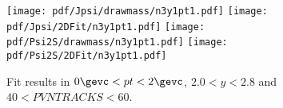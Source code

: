 \begin{figure}[H]
\begin{center}
\texttt{[image: pdf/Jpsi/drawmass/n3y1pt1.pdf]}
\texttt{[image: pdf/Jpsi/2DFit/n3y1pt1.pdf]}
\vspace*{-0.5cm}
\texttt{[image: pdf/Psi2S/drawmass/n3y1pt1.pdf]}
\texttt{[image: pdf/Psi2S/2DFit/n3y1pt1.pdf]}
\vspace*{-0.5cm}
\end{center}
\caption{Fit results in $0\gevc<pt<2\gevc$, $2.0<y<2.8$ and $40<PVNTRACKS<60$.}
\label{Fitn3y1pt1}
\end{figure}
